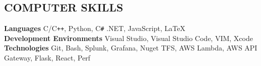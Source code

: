 \documentclass[overlapped]{res}
\begin{document}
\begin{resume}
\section{COMPUTER SKILLS}



    \textbf{Languages} C/C\texttt{++}, Python, C\texttt{\#} .NET,
      JavaScript, LaTeX\\
     \textbf{Development Environments} Visual Studio, Visual Studio Code, VIM, Xcode\\
     \textbf{Technologies} Git, Bash, Splunk, Grafana, Nuget
     TFS, AWS Lambda, AWS API Gateway, Flask, React, Perf




\end{resume}
\end{document}
